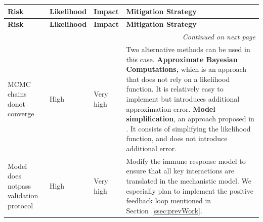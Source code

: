 \documentclass[11pt]{article}
\begin{document}
\begin{table}[!ht]
    \caption{Table of the different risks associated with the project's objectives}

    \label{tbl:hyperparams}
\begin{longtable}{|p{3.5cm}|p{2.3cm}|p{2.3cm}|p{8cm}|}
    \hline
    \textbf{Risk} & \textbf{Likelihood} & \textbf{Impact} & \textbf{Mitigation Strategy}\\
    \hline
    \endfirsthead
    \hline
    \textbf{Risk} & \textbf{Likelihood} & \textbf{Impact} & \textbf{Mitigation Strategy}\\
    \hline
    \endhead
    \hline
    \multicolumn{4}{|r|}{\textit{Continued on next page}} \\
    \hline
    \endfoot
    \hline
\endlastfoot
        \hline
        MCMC chains do\newline not converge  & High & Very high & 
        Two alternative methods can be used in this case.
        \textbf{Approximate Bayesian Computations,} which is an approach that does not rely on a likelihood function. It is relatively easy to implement but introduces additional approximation error. \textbf{Model simplification}, an approach proposed in \cite{gelman2020bayesian}. It consists of simplifying the likelihood function, and does not introduce additional error.
        \\ \hline 
        Model does not\newline pass validation protocol& High & Very high & Modify the immune response model to ensure that all key interactions are translated in the mechanistic model. We especially plan to implement the positive feedback loop mentioned in Section~\ref{ssec:prevWork}. \\ \hline 
\end{longtable}
\end{table}
\end{document}
